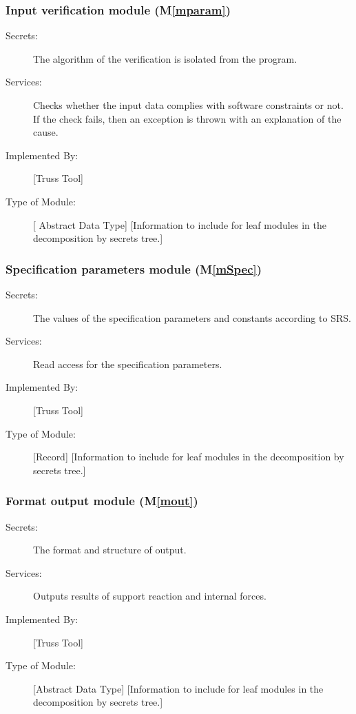 \documentclass[12pt, titlepage]{article}
\newcommand{\mref}[1]{M\ref{#1}}
\begin{document}
\subsubsection{Input verification module (\mref{mparam})}

\begin{description}
\item[Secrets:] The algorithm of the verification is isolated from the program.
\item[Services:] Checks whether the input data complies with software constraints or not. If the check fails, then an exception is thrown with an explanation of the cause.
\item[Implemented By:] [Truss Tool]
\item[Type of Module:] [ Abstract Data Type]
  [Information to include for leaf modules in the decomposition by secrets tree.]
\end{description}
\subsubsection{Specification parameters module (\mref{mSpec})}

\begin{description}
\item[Secrets:]The values of the specification parameters and constants according to SRS.
\item[Services:] Read access for the specification parameters.
\item[Implemented By:] [Truss Tool]
\item[Type of Module:] [Record]
  [Information to include for leaf modules in the decomposition by secrets tree.]
\end{description}
\subsubsection{Format output module (\mref{mout})}

\begin{description}
\item[Secrets:]The format and structure of output.
\item[Services:] Outputs results of support reaction and internal forces.
\item[Implemented By:] [Truss Tool]
\item[Type of Module:] [Abstract Data Type]
  [Information to include for leaf modules in the decomposition by secrets tree.]
\end{description}
\end{document}
